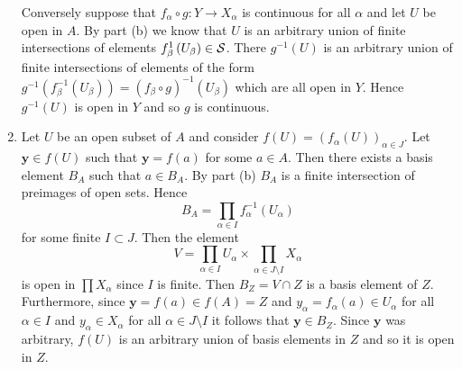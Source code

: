 \begin{sol}
\begin{enumerate}
        Conversely suppose that  $f_\alpha\circ g:Y\to X_\alpha$ is continuous for all $\alpha$ and let $U$ be open in $A$.
        By part (b) we know that $U$ is an arbitrary union of finite intersections of elements $f^{1}_\beta\left(U_\beta\right)\in\mathcal{S}$. 
        There $g^{-1}(U)$ is an arbitrary union of finite intersections of elements of the form $g^{-1}\left(f^{-1}_\beta\left(U_\beta\right)\right)=\left(f_\beta\circ g\right)^{-1}\left(U_\beta\right)$ which are all open in $Y$.
        Hence $g^{-1}(U)$ is open in $Y$ and so $g$ is continuous.
        \item Let $U$ be an open subset of $A$ and consider $f(U)=\left(f_\alpha(U)\right)_{\alpha\in J}$.
            Let $\mathbf{y}\in f\left(U\right)$ such that $\mathbf{y}=f(a)$ for some $a\in A$. 
            Then there exists a basis element $B_A$ such that $a\in B_A$. By part (b) $B_A$ is a finite intersection of preimages of open sets. 
            Hence
            $$ B_A=\prod_{\alpha\in I}f^{-1}_\alpha\left(U_\alpha\right)$$
            for some finite $I\subset J$. Then the element
            $$ V = \prod_{\alpha\in I}U_\alpha\times\prod_{\alpha\in J\setminus I}X_\alpha$$
            is open in $\prod X_\alpha$ since $I$ is finite. Then $B_Z=V\cap Z$ is a basis element of $Z$. 
            Furthermore, since $\mathbf{y}=f(a)\in f(A)=Z$ and $y_\alpha=f_\alpha(a)\in U_\alpha$ for all $\alpha\in I$ and $y_\alpha\in X_\alpha$ for all $\alpha\in J\setminus I$ it follows that $\mathbf{y}\in B_Z$.
            Since $\mathbf{y}$ was arbitrary, $f(U)$ is an arbitrary union of basis elements in $Z$ and so it is open in $Z$. 
            
    \end{enumerate}
\end{sol}